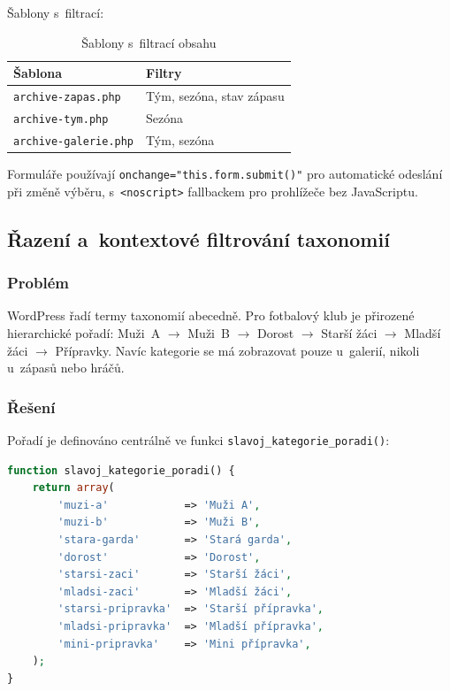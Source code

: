 \documentclass[12pt,a4paper]{article}
\begin{document}
Šablony s~filtrací:

\begin{table}[H]
\centering
\begin{tabular}{ll}
\toprule
\textbf{Šablona} & \textbf{Filtry} \\
\midrule
\texttt{archive-zapas.php} & Tým, sezóna, stav zápasu \\
\texttt{archive-tym.php} & Sezóna \\
\texttt{archive-galerie.php} & Tým, sezóna \\
\bottomrule
\end{tabular}
\caption{Šablony s~filtrací obsahu}
\end{table}

Formuláře používají \texttt{onchange="this.form.submit()"} pro automatické odeslání při změně výběru, s~\texttt{<noscript>} fallbackem pro prohlížeče bez JavaScriptu.

\subsection{Řazení a~kontextové filtrování taxonomií}

\subsubsection{Problém}

WordPress řadí termy taxonomií abecedně. Pro fotbalový klub je přirozené hierarchické pořadí: Muži~A $\rightarrow$ Muži~B $\rightarrow$ Dorost $\rightarrow$ Starší žáci $\rightarrow$ Mladší žáci $\rightarrow$ Přípravky. Navíc kategorie  se má zobrazovat pouze u~galerií, nikoli u~zápasů nebo hráčů.

\subsubsection{Řešení}

Pořadí je definováno centrálně ve funkci \texttt{slavoj\_kategorie\_poradi()}:

\begin{lstlisting}[language=PHP]
function slavoj_kategorie_poradi() {
    return array(
        'muzi-a'            => 'Muži A',
        'muzi-b'            => 'Muži B',
        'stara-garda'       => 'Stará garda',
        'dorost'            => 'Dorost',
        'starsi-zaci'       => 'Starší žáci',
        'mladsi-zaci'       => 'Mladší žáci',
        'starsi-pripravka'  => 'Starší přípravka',
        'mladsi-pripravka'  => 'Mladší přípravka',
        'mini-pripravka'    => 'Mini přípravka',
    );
}
\end{lstlisting}
\end{document}
